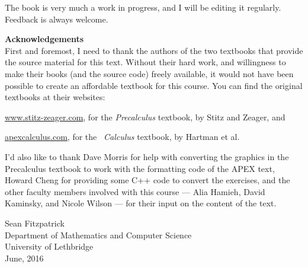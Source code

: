 The book is very much a work in progress, and I will be editing it regularly. Feedback is always welcome. 

\newpage

\noindent\textbf{\large Acknowledgements}\\

First and foremost, I need to thank the authors of the two textbooks that provide the source material for this text. Without their hard work, and willingness to make their books (and the source code) freely available, it would not have been possible to create an affordable textbook for this course. You can find the original textbooks at their websites:

\bigskip


\href{http://www.stitz-zeager.com}{www.stitz-zeager.com}, for the \textit{Precalculus} textbook, by Stitz and Zeager, and

\bigskip


\href{http://www.apexcalculus.com}{apexcalculus.com}, for the \apex\ \textit{Calculus} textbook, by Hartman et al.

\bigskip

I'd also like to thank Dave Morris for help with converting the graphics in the Precalculus textbook to work with the formatting code of the APEX text, Howard Cheng for providing some C++ code to convert the exercises, and the other faculty members involved with this course --- Alia Hamieh, David Kaminsky, and Nicole Wilson --- for their input on the content of the text.

\vspace{1in}

\begin{raggedright}
Sean Fitzpatrick\\
Department of Mathematics and Computer Science\\
University of Lethbridge\\
June, 2016
\end{raggedright}




